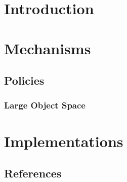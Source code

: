 \documentclass{book}
\begin{document}
\part{Introduction}






%
%








\part{Mechanisms}


\chapter{Policies}

\section{Large Object Space}
\label{sec:policy:LargeObject}



\part{Implementations}



\chapter*{References}



\end{document}
